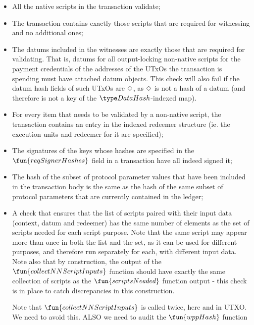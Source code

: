 \begin{itemize}

\item All the native scripts in the transaction validate;

\item The transaction contains exactly those scripts that are required for witnessing and no
additional ones;

    \item The datums included in the witnesses are exactly those that are required for validating. That is,
    datums for all output-locking non-native scripts for the payment credentials of the addresses of the
    UTxOs the transaction is spending must have attached datum objects. This check will also fail if
    the datum hash fields of such UTxOs are $\Diamond$, as $\Diamond$ is not a
    hash of a datum (and therefore is not a key of the $\DataHash$-indexed map).

    \item For every item that needs to be validated by a non-native script, the transaction contains
      an entry in the indexed redeemer structure (ie. the execution units and redeemer for it are specified);

    \item The signatures of the keys whose hashes are specified in the
    $\fun{reqSignerHashes}$ field in a transaction
    have all indeed signed it;

    \item
    The hash of the subset of protocol parameter values that have been included in the transaction body is the same as
    the hash of the same subset of protocol parameters that are currently contained in the ledger;

    \item A check that ensures that the list of scripts paired with their input data (context, datum and redeemer)
    has the same number of elements as the set of scripts needed for each script purpose. Note that the same
    script may appear more than once in both the list and the set, as it can be used for different purposes, and therefore
    run separately for each, with different input data. Note also that by construction, the output of
    the $\fun{collectNNScriptInputs}$ function should have exactly the same collection of scripts as
    the $\fun{scriptsNeeded}$ function output - this check is in place to catch discrepancies in this construction.
    \begin{note}
      Note that $\fun{collectNNScriptInputs}$ is called twice, here and in UTXO. We need to avoid this.
      ALSO we need to audit the $\fun{wppHash}$ function
    \end{note}
\end{itemize}

